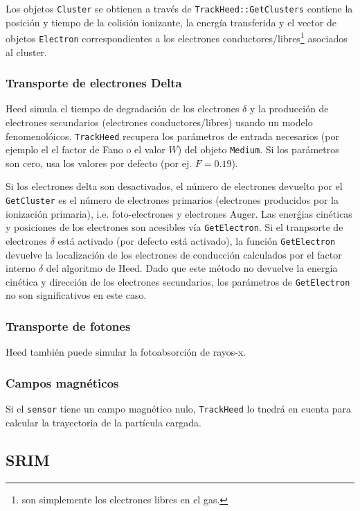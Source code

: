 Los objetos \texttt{Cluster} se obtienen a través de \texttt{TrackHeed::GetClusters} contiene la posición y tiempo de la colisión ionizante, la energía transferida y el vector de objetos \texttt{Electron} correspondientes a los electrones conductores/libres\footnote{son simplemente los electrones libres en el gas.} asociados al cluster. 

\subsubsection{Transporte de electrones Delta}

Heed simula el tiempo de degradación de los electrones $\delta$ y la producción de electrones secundarios (electrones conductores/libres) usando un modelo fenomenolóicos. \texttt{TrackHeed} recupera los parámetros de entrada necesarios (por ejemplo el el factor de Fano o el valor $W$) del objeto \texttt{Medium}. Si los parámetros son cero, usa los valores por defecto (por ej. $F=0.19$).


Si los electrones delta son desactivados, el número de electrones devuelto por el \texttt{GetCluster} es el número de electrones primarios (electrones producidos por la ionización primaria), i.e. foto-electrones y electrones Auger. Las enerǵias cinéticas y posiciones de los electrones son acesibles vía \texttt{GetElectron}. Si el tranpsorte de electrones $\delta$ está activado (por defecto está activado), la función \texttt{GetElectron} devuelve la localización de los electrones de conducción calculados por el factor interno $\delta$ del algoritmo de Heed. Dado que este método no devuelve la energía cinética y dirección de los electrones secundarios, los parámetros de \texttt{GetElectron} no son significativos en este caso.

\subsubsection{Transporte de fotones}

Heed también puede simular la fotoabsorción de rayos-x. 

\subsubsection{Campos magnéticos}

Si el \texttt{sensor} tiene un campo magnético nulo, \texttt{TrackHeed} lo tnedrá en cuenta para calcular la trayectoria de la partícula cargada.

\subsection{SRIM}

